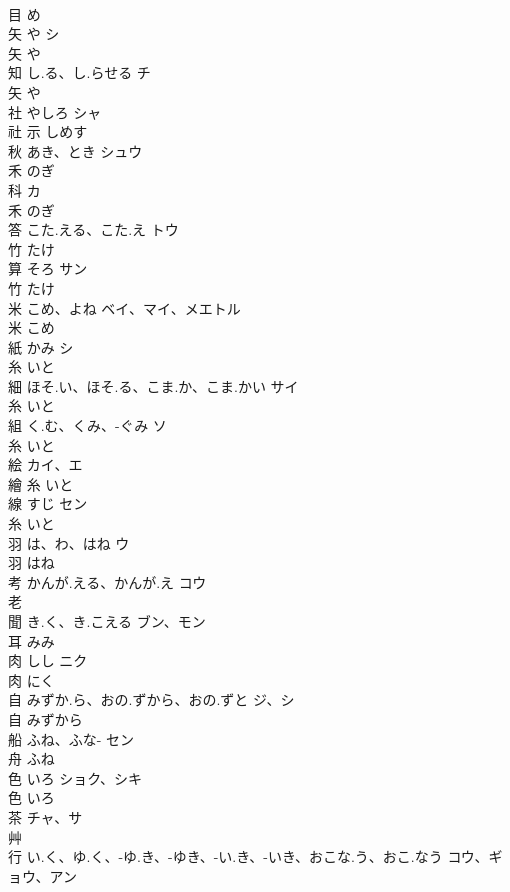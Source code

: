 \documentclass[8pt]{extreport}
\begin{document}
\begin{CJK}{UTF8}{min}
\\	目		め		
\\	矢	や	シ	
\\	矢		や		
\\	知	し.る、し.らせる	チ	
\\	矢		や		
\\	社	やしろ	シャ	
\\	社	示		しめす		
\\	秋	あき、とき	シュウ	
\\	禾		のぎ		
\\	科		カ	
\\	禾		のぎ		
\\	答	こた.える、こた.え	トウ	
\\	竹		たけ		
\\	算	そろ	サン	
\\	竹		たけ		
\\	米	こめ、よね	ベイ、マイ、メエトル	
\\	米		こめ		
\\	紙	かみ	シ	
\\	糸		いと		
\\	細	ほそ.い、ほそ.る、こま.か、こま.かい	サイ	
\\	糸		いと		
\\	組	く.む、くみ、-ぐみ	ソ	
\\	糸		いと		
\\	絵		カイ、エ	
\\	繪	糸		いと		
\\	線	すじ	セン	
\\	糸		いと		
\\	羽	は、わ、はね	ウ	
\\	羽		はね		
\\	考	かんが.える、かんが.え	コウ	
\\	老				
\\	聞	き.く、き.こえる	ブン、モン	
\\	耳		みみ		
\\	肉	しし	ニク	
\\	肉		にく		
\\	自	みずか.ら、おの.ずから、おの.ずと	ジ、シ	
\\	自		みずから		
\\	船	ふね、ふな-	セン	
\\	舟		ふね		
\\	色	いろ	ショク、シキ	
\\	色		いろ		
\\	茶		チャ、サ	
\\	艸				
\\	行	い.く、ゆ.く、-ゆ.き、-ゆき、-い.き、-いき、おこな.う、おこ.なう	コウ、ギョウ、アン	

\end{CJK}
\end{document}
